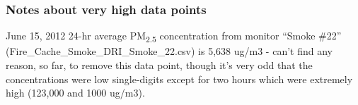 \subsubsection{Notes about very high data points}

June 15, 2012 24-hr average PM\textsubscript{2.5} concentration from monitor ``Smoke \#22'' (Fire\_Cache\_Smoke\_DRI\_Smoke\_22.csv) is 5,638 ug/m3 - can't find any reason, so far, to remove this data point, though it's very odd that the concentrations were low single-digits except for two hours which were extremely high (123,000 and 1000 ug/m3).



